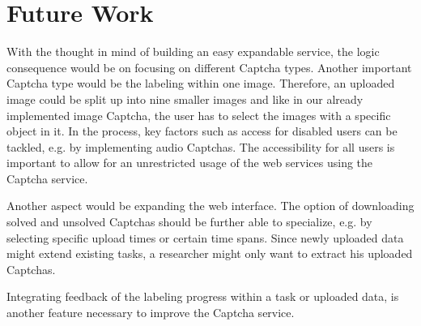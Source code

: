 \section{Future Work}
\label{sec:future_work}

With the thought in mind of building an easy expandable service, the logic consequence would be on focusing on different Captcha types. Another important Captcha type would be the labeling within one image. Therefore, an uploaded image could be split up into nine smaller images and like in our already implemented image Captcha, the user has to select the images with a specific object in it. In the process, key factors such as access for disabled users can be tackled, e.g. by implementing audio Captchas. The accessibility for all users is important to allow for an unrestricted usage of the web services using the Captcha service.

Another aspect would be expanding the web interface. The option of downloading solved and unsolved Captchas should be further able to specialize, e.g. by selecting specific upload times or certain time spans. Since newly uploaded data might extend existing tasks, a researcher might only want to extract his uploaded Captchas.

Integrating feedback of the labeling progress within a task or uploaded data, is another feature necessary to improve the Captcha service.

\clearpage
